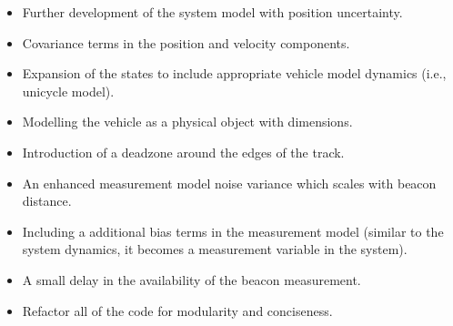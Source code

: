 \begin{itemize}
    \item Further development of the system model with position uncertainty.
    \item Covariance terms in the position and velocity components.
    \item Expansion of the states to include appropriate vehicle model dynamics (i.e., unicycle model).
    \item Modelling the vehicle as a physical object with dimensions.
    \item Introduction of a deadzone around the edges of the track.
    \item An enhanced measurement model noise variance which scales with beacon distance.
    \item Including a additional bias terms in the measurement model (similar to the system dynamics, it becomes a measurement variable in the system).
    \item A small delay in the availability of the beacon measurement.
    \item Refactor all of the code for modularity and conciseness.
\end{itemize}